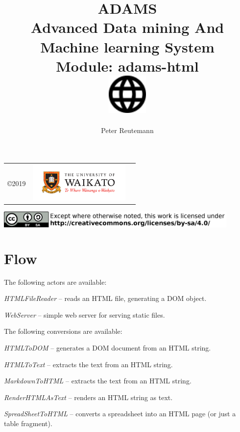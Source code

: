 \documentclass[a4paper]{book}
\title{
  \textbf{ADAMS} \\
  {\Large \textbf{A}dvanced \textbf{D}ata mining \textbf{A}nd \textbf{M}achine
  learning \textbf{S}ystem} \\
  {\Large Module: adams-html} \\
  \vspace{1cm}
  \includegraphics[width=2cm]{images/html-module.png} \\
}
\author{
  Peter Reutemann
}
\begin{document}
\begin{titlepage}
\maketitle

\thispagestyle{empty}
\center
\begin{table}[b]
	\begin{tabular}{c l l}
		\parbox[c][2cm]{2cm}{\copyright 2019} &
		\parbox[c][2cm]{5cm}{\includegraphics[width=5cm]{images/coat_of_arms.pdf}} \\
	\end{tabular}
	\includegraphics[width=12cm]{images/cc.png} \\
\end{table}

\end{titlepage}

\tableofcontents

\chapter{Flow}
The following actors are available:
\begin{tight_itemize}
    \item \textit{HTMLFileReader} -- reads an HTML file, generating a DOM object.
    \item \textit{WebServer} -- simple web server for serving static files.
\end{tight_itemize}
The following conversions are available:
\begin{tight_itemize}
    \item \textit{HTMLToDOM} -- generates a DOM document from an HTML string.
    \item \textit{HTMLToText} -- extracts the text from an HTML string.
    \item \textit{MarkdownToHTML} -- extracts the text from an HTML string.
    \item \textit{RenderHTMLAsText} -- renders an HTML string as text.
    \item \textit{SpreadSheetToHTML} -- converts a spreadsheet into an HTML
    page (or just a table fragment).
\end{tight_itemize}


\end{document}
